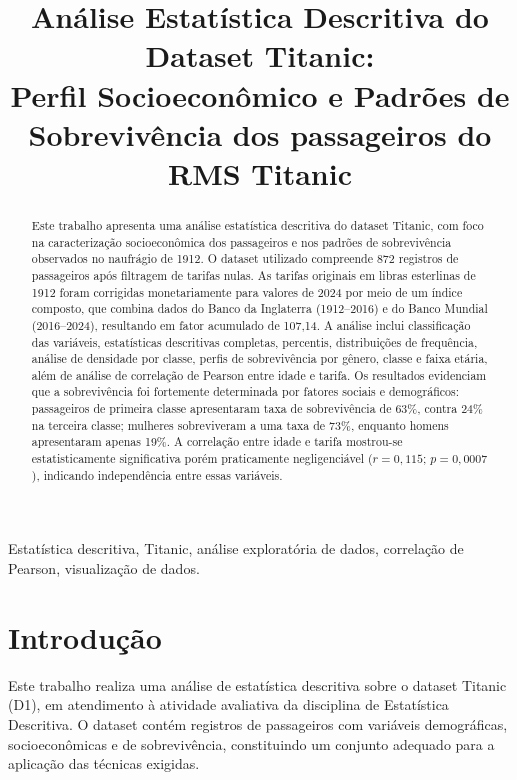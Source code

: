 \documentclass[conference]{IEEEtran}
\title{Análise Estatística Descritiva do Dataset Titanic:\\
Perfil Socioeconômico e Padrões de Sobrevivência dos passageiros do RMS Titanic}
\author{
  \IEEEauthorblockN{Heitor Teixeira - 2651254}
  \IEEEauthorblockA{
    \textit{MBA: Ciência de dados}\\
    UNIFOR\\
    Fortaleza, Brasil\\
    heitor.mba.unifor@gmail.com
  }
}
\begin{document}
\maketitle

\begin{abstract}
Este trabalho apresenta uma análise estatística descritiva do dataset
Titanic, com foco na caracterização socioeconômica dos passageiros e nos
padrões de sobrevivência observados no naufrágio de 1912. O dataset
utilizado compreende 872 registros de passageiros após filtragem de tarifas
nulas. As tarifas originais em libras esterlinas de 1912 foram corrigidas
monetariamente para valores de 2024 por meio de um índice composto, que
combina dados do Banco da Inglaterra (1912--2016) e do Banco Mundial
(2016--2024), resultando em fator acumulado de 107,14. A análise inclui
classificação das variáveis, estatísticas descritivas completas, percentis,
distribuições de frequência, análise de densidade por classe, perfis de
sobrevivência por gênero, classe e faixa etária, além de análise de
correlação de Pearson entre idade e tarifa. Os resultados evidenciam que a
sobrevivência foi fortemente determinada por fatores sociais e demográficos:
passageiros de primeira classe apresentaram taxa de sobrevivência de 63\%,
contra 24\% na terceira classe; mulheres sobreviveram a uma taxa de 73\%,
enquanto homens apresentaram apenas 19\%. A correlação entre idade e tarifa
mostrou-se estatisticamente significativa porém praticamente negligenciável
($r = 0{,}115$; $p = 0{,}0007$), indicando independência entre essas
variáveis.
\end{abstract}

\begin{IEEEkeywords}
Estatística descritiva, Titanic, análise exploratória de dados,
correlação de Pearson, visualização de dados.
\end{IEEEkeywords}

\section{Introdução}

Este trabalho realiza uma análise de estatística descritiva sobre o dataset
Titanic (D1), em atendimento à atividade avaliativa da disciplina de
Estatística Descritiva. O dataset contém registros de passageiros com
variáveis demográficas, socioeconômicas e de sobrevivência, constituindo
um conjunto adequado para a aplicação das técnicas exigidas.
\end{document}
